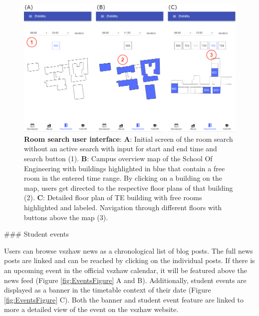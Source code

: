 \begin{markdown}
\begin{figure}[H]
  \includegraphics[width=16cm, center]{./figures/roomsearch_figure1.png}
  \captionsetup{width=15.5cm}
  \caption[Room search user interface]{\textbf{Room search user interface}: \textbf{A}: Initial screen of the room search without an active search with input for start and end time and search button (1). \textbf{B}: Campus overview map of the School Of Engineering with buildings highlighted in blue that contain a free room in the entered time range. By clicking on a building on the map, users get directed to the respective floor plans of that building (2). \textbf{C}: Detailed floor plan of TE building with free rooms highlighted and labeled. Navigation through different floors with buttons above the map (3).}
  \label{fig:RoomSearchFigure}
\end{figure}

### Student events

Users can browse vszhaw news as a chronological list of blog posts. The full news posts are linked and can be reached by clicking on the individual posts. If there is an upcoming event in the official vszhaw calendar, it will be featured above the news feed (Figure \ref{fig:EventsFigure} A and B). Additionally, student events are displayed as a banner in the timetable context of their date (Figure \ref{fig:EventsFigure} C). Both the banner and student event feature are linked to more a detailed view of the event on the vszhaw website.


\end{markdown}
